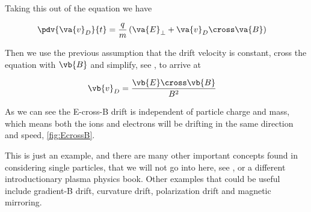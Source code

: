 	Taking this out of the equation we have

	\begin{align}
		\pdv{\va{v}_D}{t} &= \frac{q}{m} \left( \va{E}_\perp + \va{v}_D \cross \va{B} \right)
	\end{align}

	Then we use the previous assumption that the drift velocity is constant,
	cross the equation with \(\vb{B}\) and simplify, see \citet{goldston_introduction_1995},
	to arrive at

	\begin{align}
		\vb{v}_D &= \frac{\vb{E}\cross\vb{B}}{B^2}
	\end{align}

	As we can see the E-cross-B drift is independent of particle charge and mass,
	which means both the ions and electrons will be drifting in the same direction and
	speed, \cref{fig:EcrossB}.

	This is just an example, and there are many other important concepts found in
	considering single particles, that we will not go into here, see \citet{fitzpatrick_plasma_2014},
	or a different introductionary plasma physics book.
	Other examples that could be useful include gradient-B drift, curvature drift,
	polarization drift and magnetic mirroring.
